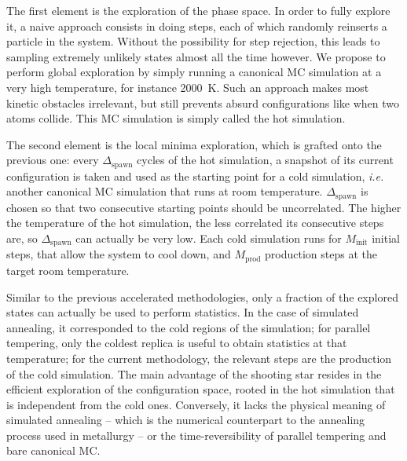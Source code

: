 \documentclass[main.tex]{subfiles}
\begin{document}
The first element is the exploration of the phase space. In order to fully explore it, a naive approach consists in doing steps, each of which randomly reinserts a particle in the system. Without the possibility for step rejection, this leads to sampling extremely unlikely states almost all the time however. We propose to perform global exploration by simply running a canonical MC simulation at a very high temperature, for instance \qty{2000}{K}. Such an approach makes most kinetic obstacles irrelevant, but still prevents absurd configurations like when two atoms collide. This MC simulation is simply called the hot simulation.

The second element is the local minima exploration, which is grafted onto the previous one: every $\Delta_{\text{spawn}}$ cycles of the hot simulation, a snapshot of its current configuration is taken and used as the starting point for a cold simulation, \textit{i.e.} another canonical MC simulation that runs at room temperature. $\Delta_{\text{spawn}}$ is chosen so that two consecutive starting points should be uncorrelated. The higher the temperature of the hot simulation, the less correlated its consecutive steps are, so $\Delta_{\text{spawn}}$ can actually be very low. Each cold simulation runs for $M_\text{init}$ initial steps, that allow the system to cool down, and $M_\text{prod}$ production steps at the target room temperature.

Similar to the previous accelerated methodologies, only a fraction of the explored states can actually be used to perform statistics. In the case of simulated annealing, it corresponded to the cold regions of the simulation; for parallel tempering, only the coldest replica is useful to obtain statistics at that temperature; for the current methodology, the relevant steps are the production of the cold simulation. The main advantage of the shooting star resides in the efficient exploration of the configuration space, rooted in the hot simulation that is independent from the cold ones. Conversely, it lacks the physical meaning of simulated annealing -- which is the numerical counterpart to the annealing process used in metallurgy -- or the time-reversibility of parallel tempering and bare canonical MC.
\end{document}
